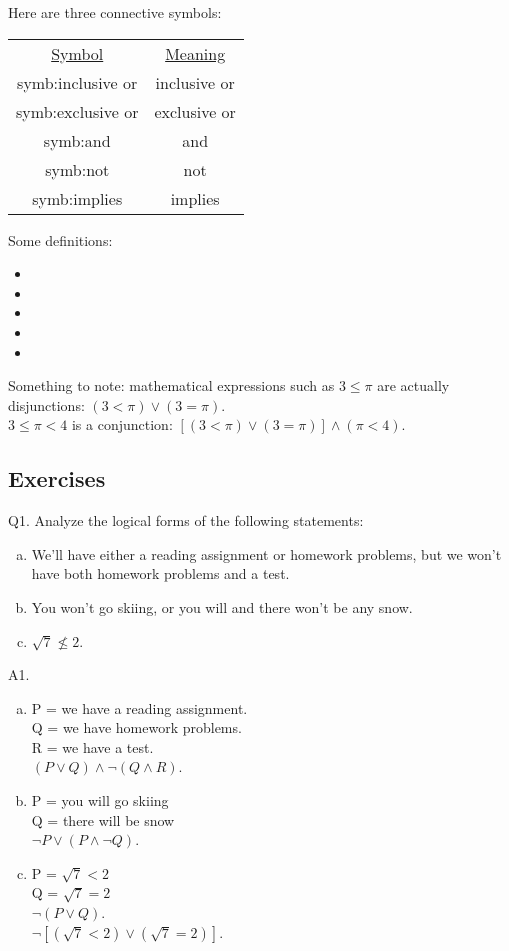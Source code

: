\documentclass{article}
\begin{document}
Here are three connective symbols:
\begin{center}
\begin{tabular}{@{}cc@{}}
	\underline{Symbol} & \underline{Meaning} \\
	\gls{symb:inclusive or} & inclusive or \\
	\gls{symb:exclusive or} & exclusive or \\
	\gls{symb:and} & and \\
	\gls{symb:not} & not \\
    \gls{symb:implies} & implies
\end{tabular}
\end{center}

Some definitions:\\
\begin{itemize}
	\item {}
	\item {}
	\item {}
    \item {}
	\item {}
\end{itemize}
\noindent
Something to note: mathematical expressions such as $3 \leq \pi$ are actually disjunctions: $(3 < \pi) \lor (3 = \pi)$.\\
$3 \leq \pi < 4$ is a conjunction: $[(3 < \pi) \lor (3 = \pi)] \land (\pi < 4)$.\\

\subsection{Exercises}
Q1. Analyze the logical forms of the following statements:
\begin{enumerate}[(a)]
	\item We’ll have either a reading assignment or homework problems, but we won’t have both homework problems and a test.
	\item You won’t go skiing, or you will and there won’t be any snow.
	\item $\sqrt{7} \nleq 2$.
\end{enumerate}
A1.
\begin{enumerate}[(a)]
\item
P = we have a reading assignment.\\
Q = we have homework problems.\\
R = we have a test.\\
$(P \lor Q) \land \lnot(Q \land R)$.
\item
P = you will go skiing\\
Q = there will be snow\\
$\lnot P \lor (P \land \lnot Q)$.
\item
P = $\sqrt{7} < 2$\\
Q = $\sqrt{7} = 2$\\
$\lnot(P \lor Q)$.\\
$\lnot[(\sqrt{7} < 2) \lor (\sqrt{7} = 2)]$.
\end{enumerate}
\end{document}
